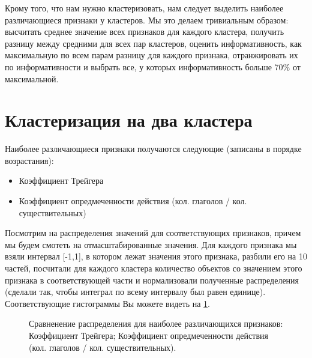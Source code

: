 \documentclass[12pt]{article}
\begin{document}
Крому того, что нам нужно кластеризовать, нам следует выделить наиболее различающиеся признаки у кластеров. Мы это делаем тривиальным образом: высчитать среднее значение всех признаков для каждого кластера, получить разницу между средними для всех пар кластеров, оценить информативность, как максимальную по всем парам разницу для каждого признака, отранжировать их по информативности и выбрать все, у которых информативность больше 70$\%$ от максимальной.

\section{Кластеризация на два кластера}
\label{sec:cluster}

Наиболее различающиеся признаки получаются следующие (записаны в порядке возрастания):

\begin{itemize}
\item Коэффициент Трейгера
\item Коэффициент опредмеченности действия (кол. глаголов / кол. существительных)
\end{itemize}

Посмотрим на распределения значений для соответствующих признаков, причем мы будем смотеть на отмасштабированные значения. Для каждого признака мы взяли интервал [-1,1], в котором лежат значения этого признака, разбили его на 10 частей, посчитали для каждого кластера количество объектов со значением этого признака в соответствующей части и нормализовали полученные распределения (сделали так, чтобы интеграл по всему интервалу был равен единице). Соответствующие гистограммы Вы можете видеть на \ref{hist1}.

\begin{figure}[ht!]  
\vspace{-4ex} \centering {}  
\hspace{2ex}

\caption{Сравненение распределения для наиболее различающихся признаков:  Коэффициент Трейгера;  Коэффициент опредмеченности действия (кол. глаголов / кол. существительных).} \label{hist1}
\end{figure}
\end{document}

